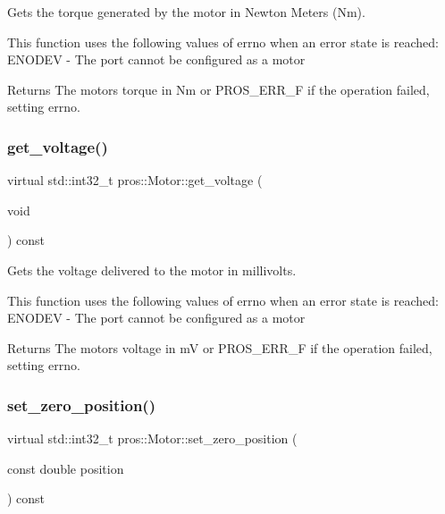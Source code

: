 Gets the torque generated by the motor in Newton Meters (Nm). 

This function uses the following values of errno when an error state is reached\+: E\+N\+O\+D\+EV -\/ The port cannot be configured as a motor

\begin{DoxyReturn}{Returns}
The motor\textquotesingle{}s torque in Nm or P\+R\+O\+S\+\_\+\+E\+R\+R\+\_\+F if the operation failed, setting errno. 
\end{DoxyReturn}
\mbox{\label{classpros_1_1Motor_abe51732c37c2ec72a8bdceac7f6962cb}} 
\subsubsection{\texorpdfstring{get\+\_\+voltage()}{get\_voltage()}}
{\footnotesize\ttfamily virtual std\+::int32\+\_\+t pros\+::\+Motor\+::get\+\_\+voltage (\begin{DoxyParamCaption}\item[{void}]{ }\end{DoxyParamCaption}) const\hspace{0.3cm}{\ttfamily [virtual]}}



Gets the voltage delivered to the motor in millivolts. 

This function uses the following values of errno when an error state is reached\+: E\+N\+O\+D\+EV -\/ The port cannot be configured as a motor

\begin{DoxyReturn}{Returns}
The motor\textquotesingle{}s voltage in mV or P\+R\+O\+S\+\_\+\+E\+R\+R\+\_\+F if the operation failed, setting errno. 
\end{DoxyReturn}
\mbox{\label{classpros_1_1Motor_af20c036c1d5d68eb5e762c12f9a4b7fe}} 
\subsubsection{\texorpdfstring{set\+\_\+zero\+\_\+position()}{set\_zero\_position()}}
{\footnotesize\ttfamily virtual std\+::int32\+\_\+t pros\+::\+Motor\+::set\+\_\+zero\+\_\+position (\begin{DoxyParamCaption}\item[{const double}]{position }\end{DoxyParamCaption}) const\hspace{0.3cm}{\ttfamily [virtual]}}



